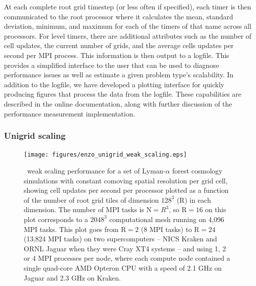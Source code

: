 At each complete root grid timestep (or less often if specified),
each timer is then communicated to the root processor where it
calculates the mean, standard deviation, minimum, and maximum for each
of the timers of that name across all processors.  For level timers, there are additional
attributes such as the number of cell updates, the current number of
grids, and the average cells updates per second per MPI process.  This
information is then 
output to a logfile.  This provides a simplified interface to the user
that can be used to diagnose performance issues as well as estimate a
given problem type's scalability.  In addition to the logfile, we have
developed a plotting interface for quickly producing figures that
process the data from the logfile.  These capabilities are described
in the online documentation, along with further discussion of the
performance measurement implementation.

\subsubsection{Unigrid scaling}
\label{sec:weak_scaling}

\begin{figure}
\begin{center}
\texttt{[image: figures/enzo\_unigrid\_weak\_scaling.eps]}
\caption{\enzo\ weak scaling performance for a set of Lyman-$\alpha$
forest cosmology simulations with constant comoving spatial resolution
per grid cell, showing cell updates per second per processor 
plotted as a function of the number of root grid tiles of dimension
$128^3$ (R) in each dimension.  The number of MPI tasks is N$ = R^3$,
so R$ = 16$ on this plot corresponds to a $2048^3$ computational mesh
running on 4,096 MPI tasks.  This plot goes from R$ = 2$ (8 MPI tasks)
to R$ = 24$ (13,824 MPI tasks) on two supercomputers -- NICS Kraken
and ORNL Jaguar when they were Cray XT4 systems -- and using 1, 2 or 4
MPI processes per node, where each compute node contained a single
quad-core AMD Opteron CPU with a speed of 2.1 GHz on Jaguar and 2.3
GHz on Kraken.}
\label{fig.uniscale}
\end{center}
\end{figure}

